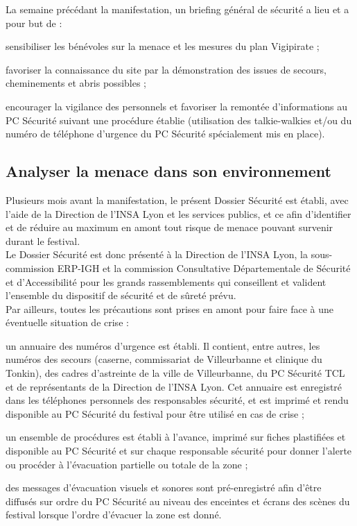 \documentclass[hidelinks, paper=a4, fontsize=13pt]{report}
\begin{document}
La semaine précédant la manifestation, un briefing général de sécurité a lieu et a pour but de :
\begin{list}{•}{}
	\item sensibiliser les bénévoles sur la menace et les mesures du plan Vigipirate ;
	\item favoriser la connaissance du site par la démonstration des issues de secours, cheminements et abris possibles ;
	\item encourager la vigilance des personnels et favoriser la remontée d’informations au PC Sécurité suivant une procédure établie (utilisation des talkie-walkies et/ou du numéro de téléphone d’urgence du PC Sécurité spécialement mis en place).
\end{list}

\subsection{Analyser la menace dans son environnement}

Plusieurs mois avant la manifestation, le présent Dossier Sécurité est établi, avec l'aide de la Direction de l'INSA Lyon et les services publics, et ce afin d'identifier et de réduire au maximum en amont tout risque de menace pouvant survenir durant le festival.\\

Le Dossier Sécurité est donc présenté à la Direction de l'INSA Lyon, la sous-commission ERP-IGH et la commission Consultative Départementale de Sécurité et d'Accessibilité pour les grands rassemblements qui conseillent et valident l'ensemble du dispositif de sécurité et de sûreté prévu.\\

Par ailleurs, toutes les précautions sont prises en amont pour faire face à une éventuelle situation de crise :
\begin{list}{•}{}
	\item un annuaire des numéros d'urgence est établi. Il contient, entre autres, les numéros des secours (caserne, commissariat de Villeurbanne et clinique du Tonkin), des cadres d'astreinte de la ville de Villeurbanne, du PC Sécurité TCL et de représentants de la Direction de l'INSA Lyon. Cet annuaire est enregistré dans les téléphones personnels des responsables sécurité, et est imprimé et rendu disponible au PC Sécurité du festival pour être utilisé en cas de crise ;
	\item un ensemble de procédures est établi à l'avance, imprimé sur fiches plastifiées et disponible au PC Sécurité et sur chaque responsable sécurité pour donner l'alerte ou procéder à l'évacuation partielle ou totale de la zone ;
	\item des messages d'évacuation visuels et sonores sont pré-enregistré afin d'être diffusés sur ordre du PC Sécurité au niveau des enceintes et écrans des scènes du festival lorsque l'ordre d'évacuer la zone est donné.\\
\end{list}
\end{document}
